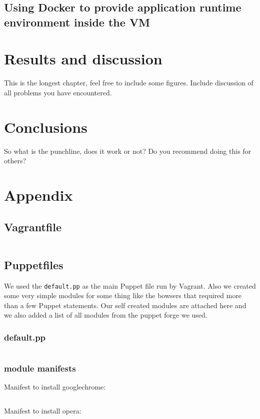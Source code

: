 \subsection{Using Docker to provide application runtime environment inside the \gls{VM}}




\section{Results and discussion}

This is the longest chapter, feel free to include some figures. Include
discussion of all problems you have encountered.



\section{Conclusions}

So what is the punchline, does it work or not? Do you recommend doing this
for others?
\cleardoublepage{}
\section{Appendix}
\subsection{Vagrantfile}
\inputminted[linenos=true]{ruby}{../../vagrant/Vagrantfile}
\subsection{Puppetfiles}
We used the  \verb|default.pp| as the main Puppet file run by Vagrant. Also we created some very simple modules for some thing like the bowsers that required more than a few Puppet statements. Our self created modules are attached here and we also added a list of all modules from the puppet forge we used.
\subsubsection{default.pp}
\inputminted[linenos=true]{puppet}{../../puppet/manifests/default.pp}
\subsubsection{module manifests}
Manifest to install googlechrome:
\inputminted[linenos=true]{puppet}{../../puppet/modules/googlechrome/manifests/init.pp}
Manifest to install opera:
\inputminted[linenos=true]{puppet}{../../puppet/modules/opera/manifests/init.pp}

